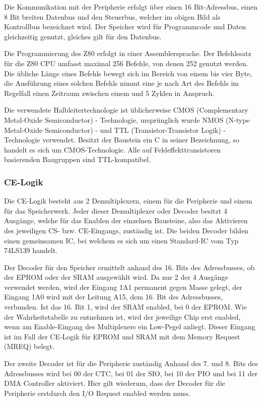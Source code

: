 Die Kommunikation mit der Peripherie erfolgt über einen 16 Bit-Adressbus, einen 8 Bit breiten Datenbus und den Steuerbus, welcher im obigen Bild als Kontrollbus bezeichnet wird. Der Speicher wird für Programmcode und Daten gleichzeitig genutzt, gleiches gilt für den Datenbus.

Die Programmierung des Z80 erfolgt in einer Assemblersprache. Der Befehlssatz für die Z80 CPU umfasst maximal 256 Befehle, von denen 252 genutzt werden. Die übliche Länge eines Befehls bewegt sich im Bereich von einem bis vier Byte, die Ausführung eines solchen Befehls nimmt eine je nach Art des Befehls im Regelfall einen Zeitraum zwischen einem und 5 Zyklen in Anspruch.

Die verwendete Halbleitertechnologie ist üblicherweise CMOS (Complementary Metal-Oxide Semiconductor) - Technologie, ursprünglich wurde NMOS (N-type Metal-Oxide Semiconductor) - und TTL (Transistor-Transistor Logik) - Technologie verwendet. Besitzt der Baustein ein C in seiner Bezeichnung, so handelt es sich um CMOS-Technologie. Alle auf Feldeffekttransistoren basierenden Baugruppen sind TTL-kompatibel.

\subsubsection{CE-Logik}
Die CE-Logik besteht aus 2 Demultiplexern, einem für die Peripherie und einem für das Speicherwerk. Jeder dieser Demultiplexer oder Decoder besitzt 4 Ausgänge, welche für das Enablen der einzelnen Bausteine, also das Aktivieren des jeweiligen CS- bzw. CE-Eingangs, zuständig ist. Die beiden Decoder bilden einen gemeinsamen IC, bei welchem es sich um einen Standard-IC vom Typ 74LS139 handelt.

Der Decoder für den Speicher ermittelt anhand des 16. Bits des Adressbusses, ob der EPROM oder der SRAM ausgewählt wird. Da nur 2 der 4 Ausgänge verwendet werden, wird der Eingang 1A1 permanent gegen Masse gelegt, der Eingang 1A0 wird mit der Leitung A15, dem 16. Bit des Adressbusses, verbunden. Ist das 16. Bit 1, wird der SRAM enabled, bei 0 der EPROM. Wie der Wahrheitstabelle zu entnehmen ist, wird der jeweilige Chip erst enabled, wenn am Enable-Eingang des Multiplexers ein Low-Pegel anliegt. Dieser Eingang ist im Fall der CE-Logik für EPROM und SRAM mit dem Memory Request (MREQ) belegt.

Der zweite Decoder ist für die Peripherie zuständig Anhand des 7. und 8. Bits des Adressbusses wird bei 00 der CTC, bei 01 der SIO, bei 10 der PIO und bei 11 der DMA Controller aktiviert. Hier gilt wiederum, dass der Decoder für die Peripherie erstdurch den I/O Request enabled werden muss.


